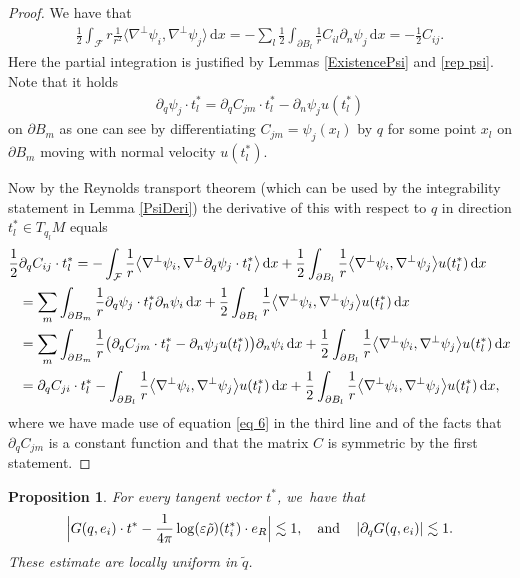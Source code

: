 \documentclass[JEP,XML,SOM,Unicode,published]{cedram}
\let\epsilon\varepsilon
\newtheorem{proposition}[theorem]{Proposition}
\theoremstyle{definition}
\newcommand\bscalar[2]{\bigl\langle #1,#2\bigr\rangle}
\newcommand\eq{=}
\newcommand\dd{\,\mathrm{d}}
\newcommand\dx{\dd x}
\let\de\partial
\let\eps\epsilon
\let\mel\relax
\begin{document}
\begin{proof}
We have that
\begin{align*}
\frac{1}{2}\int_\mathcal{F} r\frac{1}{r^2}\bscalar{\nabla^\perp\psi_i}{\nabla^\perp\psi_j}\dx\eq-\sum_l\frac{1}{2}\int_{\de B_l}\frac{1}{r}C_{il}\de_n\psi_j\dx\eq-\frac{1}{2}C_{ij}.
\end{align*}
Here the partial integration is justified by Lemmas \ref{ExistencePsi} and \ref{rep psi}.
Note that it holds
\begin{align}\label{eq 6}
\de_q\psi_j\cdot t_l^*\eq\de_q C_{jm}\cdot t_l^*-\de_n\psi_j u(t_l^*)
\end{align}
on $\de B_m$ as one can see by differentiating $C_{jm}=\psi_j(x_l)$ by $q$ for some point $x_l$ on $\de B_m$ moving with normal velocity $u(t_l^*)$.

Now by the Reynolds transport theorem (which can be used by the integrability statement in Lemma \ref{PsiDeri}) the derivative of this with respect to $q$ in direction $t_l^*\in T_{q_l}M$ equals
\begin{align*}
\mel\frac{1}{2}&\de_q C_{ij}\cdot t_l^*\eq -\int_\mathcal{F} \frac{1}{r}\bscalar{\nabla^\perp\psi_i}{\nabla^\perp\de_q\psi_j\cdot t_l^*}\dx+\frac{1}{2}\int_{\de B_l}\frac{1}{r}\bscalar{\nabla^\perp\psi_i}{\nabla^\perp\psi_j}u(t_l^*)\dx\\
&\eq\sum_{m}\int_{\de B_m}\frac{1}{r}\de_q\psi_j\cdot t_l^*\de_n\psi_i\dx+\frac{1}{2}\int_{\de B_l}\frac{1}{r}\bscalar{\nabla^\perp\psi_i}{\nabla^\perp\psi_j}u(t_l^*)\dx\\
&\eq\sum_m\int_{\de B_m}\frac{1}{r}\bigl(\de_q C_{jm}\cdot t_l^*-\de_n\psi_j u(t_l^*)\bigr)\de_n\psi_i\dx+\frac{1}{2}\int_{\de B_l}\frac{1}{r}\bscalar{\nabla^\perp\psi_i}{\nabla^\perp\psi_j}u(t_l^*)\dx\\
&\eq\de_qC_{ji}\cdot t_l^*-\int_{\de B_l}\frac{1}{r}\bscalar{\nabla^\perp\psi_i}{\nabla^\perp\psi_j} u(t_l^*)\dx+\frac{1}{2}\int_{\de B_l}\frac{1}{r}\bscalar{\nabla^\perp\psi_i}{\nabla^\perp\psi_j}u(t_l^*)\dx,
\end{align*}
where we have made use of equation \eqref{eq 6} in the third line and of the facts that $\de_q C_{jm}$ is a constant function and that the matrix $C$ is symmetric by the first statement.
\end{proof}

\begin{proposition}\label{diagonal A}
For every tangent vector $t^*$, we~have that
\[
\Bigl|G(q,e_i)\cdot t^*-\frac{1}{4\pi}\log(\eps\tilde{\rho})(t_i^*)\cdot e_R\Bigr|\lesssim 1,
\quad
\text{and}\quad
\left|\de_qG(q,e_i)\right|\lesssim 1.
\]
These estimate are locally uniform in $\tilde{q}$.
\end{proposition}
\end{document}
